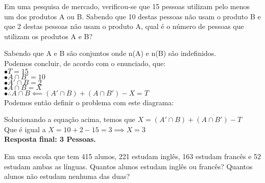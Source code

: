 \begin{problem}{}{}
    Em uma pesquisa de mercado, verificou-se que 15 pessoas utilizam pelo menos um dos produtos
    A ou B. Sabendo que 10 destas pessoas não usam o produto B e que 2 destas pessoas não usam o
    produto A, qual é o número de pessoas que utilizam os produtos A e B?
\end{problem}

\begin{solution}{}{}
    Sabendo que A e B são conjuntos onde n(A) e n(B) são indefinidos. \\
    Podemos concluir, de acordo com o enunciado, que: \\
    $\bullet T = 15$ \\
    $\bullet  A\cap B'  = 10$ \\
    $\bullet A'\cap B = 2$ \\
    $\bullet A\cap B = X$ \\
    $\bullet \therefore A\cap B \impliedby (A'\cap B) + (A\cap B') - X = T$ \\
    
    Podemos então definir o problema com este diagrama:

    
    Solucionando a equação acima, temos que $X=(A'\cap B) + (A\cap B')-T$ \\
    Que é igual a $X=10+2-15 = 3 \implies X=3$ \\
    \textbf{Resposta final: 3 Pessoas.}
\end{solution}

\begin{problem}{}{}
    Em uma escola que tem 415 alunos, 221 estudam inglês, 163 estudam francês e 52 estudam
    ambas as línguas. Quantos alunos estudam inglês ou francês? Quantos alunos não estudam
    nenhuma das duas?
\end{problem}

